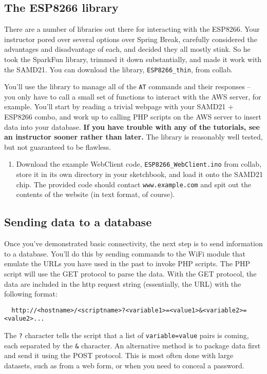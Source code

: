 \documentclass[11pt]{article} %
\begin{document}
\subsection*{The ESP8266 library}

There are a number of libraries out there for interacting with the ESP8266. Your instructor pored over several options over Spring Break, carefully considered the advantages and disadvantage of each, and decided they all mostly stink. So he took the SparkFun library, trimmed it down substantially, and made it work with the SAMD21. You can download the library, \verb|ESP8266_thin|, from collab.

You’ll use the library to manage all of the \verb|AT| commands and their responses -- you only have to call a small set of functions to interact with the AWS server, for example. You’ll start by reading a trivial webpage with your SAMD21 + ESP8266 combo, and work up to calling PHP scripts on the AWS server to insert data into your database. {\bf If you have trouble with any of the tutorials, see an instructor sooner rather than later.} The library is reasonably well tested, but not guaranteed to be flawless.
\begin{enumerate}
\item Download the example WebClient code, \verb|ESP8266_WebClient.ino| from collab, store it in its own directory in your sketchbook, and load it onto the SAMD21 chip. The provided code should contact \verb|www.example.com| and spit out the contents of the website (in text format, of course).
\end{enumerate}

\subsection*{Sending data to a database}
\label{sec:who.are.you}
Once you’ve demonstrated basic connectivity, the next step is to send information to a database. You’ll do this by sending commands to the WiFi module that emulate the URLs you have used in the past to invoke PHP scripts. The PHP script will use the GET protocol to parse the data. With the GET protocol, the data are included in the http request string (essentially, the URL) with the following format:
\begin{verbatim}
  http://<hostname>/<scriptname>?<variable1>=<value1>&<variable2>=<value2>...
\end{verbatim}
The \verb|?| character tells the script that a list of \verb|variable=value| pairs is coming, each separated by the \verb|&| character. An alternative method is to package data first and send it using the POST protocol. This is most often done with large datasets, such as from a web form, or when you need to conceal a password.
\end{document}
